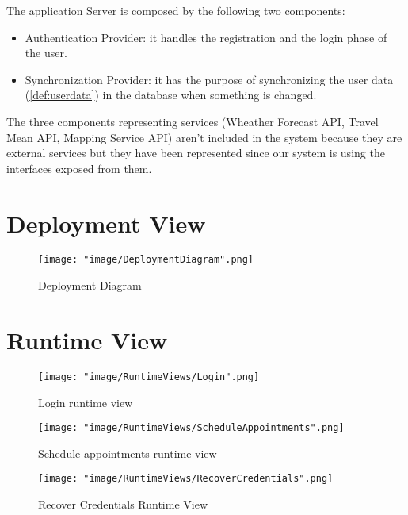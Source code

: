 The application Server is composed by the following two components:
\begin{itemize}

\item Authentication Provider: it handles the registration and the login phase of the user. 

\item Synchronization Provider: it has the purpose of synchronizing the user data (\ref{def:userdata}) in the database when something is changed.
 
\end{itemize}

The three components representing services (Wheather Forecast API, Travel Mean API, Mapping Service API) aren't included in the system because they are external services but they have been represented since our system is using the interfaces exposed from them.

\section{Deployment View}

\begin{figure}[H]
\begin{center}
\texttt{[image: "image/DeploymentDiagram".png]}
\caption{Deployment Diagram}
\end{center}
\end{figure}

\section{Runtime View}

\begin{figure}[H]
\begin{center}
\texttt{[image: "image/RuntimeViews/Login".png]}
\caption{Login runtime view}
\end{center}
\end{figure}

\begin{figure}[H]
\begin{center}
\texttt{[image: "image/RuntimeViews/ScheduleAppointments".png]}
\caption{Schedule appointments runtime view}
\end{center}
\end{figure}

\begin{figure}[H]
\begin{center}

\texttt{[image: "image/RuntimeViews/RecoverCredentials".png]}
\caption{Recover Credentials Runtime View}
\end{center}
\end{figure}

